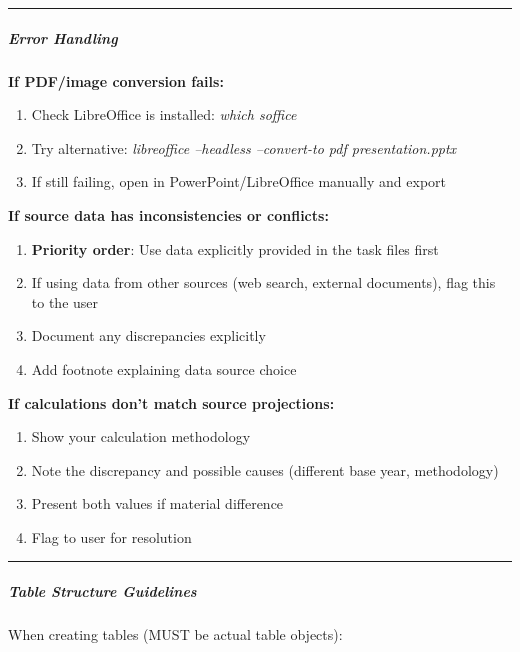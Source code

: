 \documentclass[11pt]{article}
\begin{document}
\vspace{0.5em}\hrule\vspace{0.5em}

\subparagraph{Error Handling}\mbox{}\par

\textbf{If PDF/image conversion fails:}

\begin{enumerate}[leftmargin=*,itemsep=2pt,topsep=2pt]
\item {} Check LibreOffice is installed: \emph{which soffice}
\item {} Try alternative: \emph{libreoffice --headless --convert-to pdf presentation.pptx}
\item {} If still failing, open in PowerPoint/LibreOffice manually and export
\end{enumerate}

\textbf{If source data has inconsistencies or conflicts:}

\begin{enumerate}[leftmargin=*,itemsep=2pt,topsep=2pt]
\item {} \textbf{Priority order}: Use data explicitly provided in the task files first
\item {} If using data from other sources (web search, external documents), flag this to the user
\item {} Document any discrepancies explicitly
\item {} Add footnote explaining data source choice
\end{enumerate}

\textbf{If calculations don't match source projections:}

\begin{enumerate}[leftmargin=*,itemsep=2pt,topsep=2pt]
\item {} Show your calculation methodology
\item {} Note the discrepancy and possible causes (different base year, methodology)
\item {} Present both values if material difference
\item {} Flag to user for resolution
\end{enumerate}

\vspace{0.5em}\hrule\vspace{0.5em}

\subparagraph{Table Structure Guidelines}\mbox{}\par

When creating tables (MUST be actual table objects):
\end{document}
